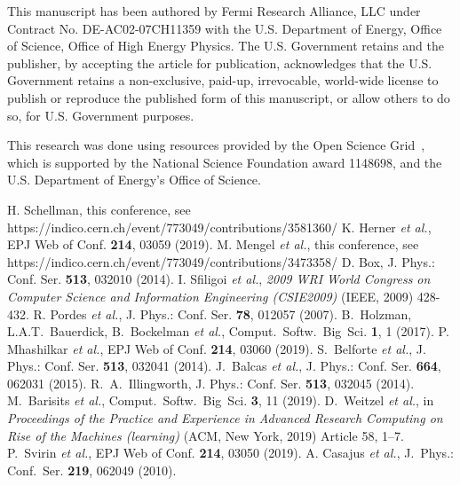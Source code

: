 \documentclass{webofc}
\begin{document}
\begin{acknowledgement}
This manuscript has been authored by Fermi Research Alliance, LLC under Contract No. DE-AC02-07CH11359 with the U.S. Department of Energy, Office of Science, Office of High Energy Physics. The U.S. Government retains and the publisher, by accepting the article for publication, acknowledges that the U.S. Government retains a non-exclusive, paid-up, irrevocable, world-wide license to publish or reproduce the published form of this manuscript, or allow others to do so, for U.S. Government purposes. 

This research was done using resources provided by the Open Science Grid~\cite{osg,glideinwms}, which is supported by the National Science Foundation award 1148698, and the U.S. Department of Energy's Office of Science.
\end{acknowledgement}

%
\begin{thebibliography}{}
%
%
H. Schellman, this conference, see https://indico.cern.ch/event/773049/contributions/3581360/
K. Herner \emph{et al.}, EPJ Web of Conf. {\bf 214}, 03059 (2019).
M. Mengel \emph{et al.}, this conference, see https://indico.cern.ch/event/773049/contributions/3473358/
 D. Box, J. Phys.: Conf. Ser. {\bf 513}, 032010 (2014).
I. Sfiligoi \emph{et al.}, \textit{2009 WRI World Congress on Computer Science and Information Engineering (CSIE2009)} (IEEE, 2009) 428-432.
R. Pordes \emph{et al.}, J. Phys.: Conf. Ser. {\bf 78}, 012057 (2007).
B.~Holzman, L.A.T.~Bauerdick, B.~Bockelman \emph{et al.}, Comput.~Softw.~Big~Sci. {\bf 1}, 1 (2017).
P. Mhashilkar \emph{et al.}, EPJ Web of Conf. {\bf 214}, 03060 (2019).
S.~Belforte \emph{et al.}, J. Phys.: Conf. Ser. {\bf 513}, 032041 (2014).
J.~Balcas \emph{et al.}, J. Phys.: Conf. Ser. {\bf 664}, 062031 (2015).
R.~A.~Illingworth, J. Phys.: Conf. Ser. {\bf 513}, 032045 (2014).
M.~Barisits \emph{et al.}, Comput.~Softw.~Big~Sci. {\bf 3}, 11 (2019).
D.~Weitzel \emph{et al.}, in {\it Proceedings of the Practice and Experience in Advanced Research Computing on Rise of the Machines (learning)} (ACM, New York, 2019) Article 58, 1--7.
P.~Svirin \emph{et al.}, EPJ Web of Conf. {\bf 214}, 03050 (2019).
A. Casajus \emph{et al.}, J.~Phys.: Conf.~Ser. {\bf 219}, 062049 (2010).
\end{thebibliography}
\end{document}
